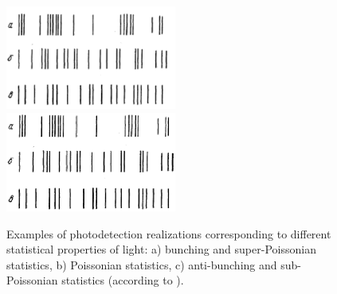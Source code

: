 \begin{figure}
\centering

\ifpdf
\includegraphics[angle=0, width=0.5\textwidth]
{./part3/nonclass/nonclassphoto.pdf}
\else
\includegraphics[angle=0, width=0.5\textwidth]
{./part3/nonclass/nonclassphoto.eps}
\fi
%

\caption{Examples of photodetection realizations corresponding to different
  statistical properties of light: a) bunching and super-Poissonian
  statistics, b) Poissonian statistics, c) anti-bunching and
  sub-Poissonian statistics (according to \cite{bNonclassSmirnovTroshin}). }
\label{figPart3Nonclass1}
\end{figure}